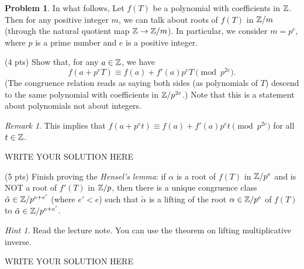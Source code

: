 \documentclass[11pt]{article}
\theoremstyle{plain}
\theoremstyle{definition}
\newtheorem{problem}{Problem}
\theoremstyle{remark}
\newtheorem*{remark}{Remark}
\newtheorem*{hint}{Hint}
\numberwithin{equation}{problem}
\begin{document}
\begin{problem}
	In what follows, Let $f(T)$ be a polynomial with coefficients in $\mathbb{Z}$. Then for any positive integer $m$, we can talk about roots of $f(T)$ in $\mathbb{Z}/m$ (through the natural quotient map $\mathbb{Z}\to\mathbb{Z}/m$). In particular, we consider $m=p^e$, where $p$ is a prime number and $e$ is a positive integer.
	\begin{listinprob}
		\item (4 pts) Show that, for any $a\in\mathbb{Z}$, we have 
		\[
			f(a+p^eT) \equiv f(a) + f'(a)p^eT \pmod{p^{2e}}.
		\]
		(The congruence relation reads as saying both sides (as polynomials of $T$) descend to the same polynomial with coefficients in $\mathbb{Z}/p^{2e}$.) Note that this is a statement about polynomials not about integers. 
		\begin{remark}
			This implies that $f(a+p^et) \equiv f(a) + f'(a)p^et \pmod{p^{2e}}$ for all $t\in\mathbb{Z}$.
		\end{remark}
\begin{solution} %
WRITE YOUR SOLUTION HERE
\end{solution}\clearpage %

		\item (5 pts) Finish proving the \emph{Hensel's lemma}: if $\alpha$ is a root of $f(T)$ in $\mathbb{Z}/p^{e}$ and is NOT a root of $f'(T)$ in $\mathbb{Z}/p$, then there is a unique congruence class $\tilde{\alpha}\in\mathbb{Z}/p^{e+e'}$ (where $e'<e$) such that $\tilde{\alpha}$ is a lifting of the root $\alpha\in\mathbb{Z}/p^{e}$ of $f(T)$ to $\tilde{\alpha}\in\mathbb{Z}/p^{e+e'}$. 
		\begin{hint}
			Read the lecture note. You can use the theorem on lifting multiplicative inverse.
		\end{hint}
	\end{listinprob}	
\begin{solution} %
WRITE YOUR SOLUTION HERE
\end{solution}\clearpage %


\end{problem}
\end{document}
